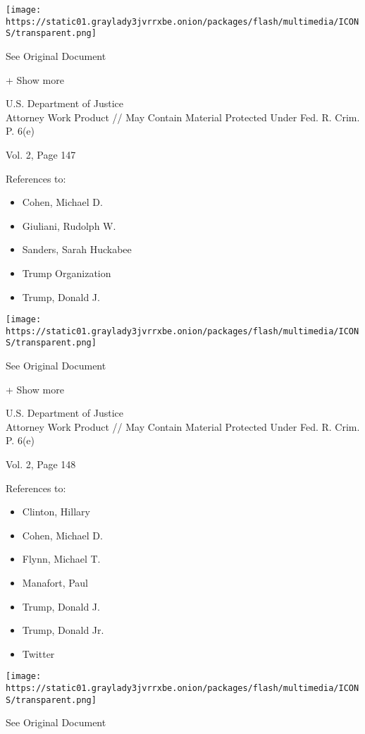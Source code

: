 \protect\hyperlink{}{}

\texttt{[image: https://static01.graylady3jvrrxbe.onion/packages/flash/multimedia/ICONS/transparent.png]}

See Original Document

+ Show more

U.S. Department of Justice\\
Attorney Work Product // May Contain Material Protected Under Fed. R.
Crim. P. 6(e)

Vol. 2, Page 147

References to:

\begin{itemize}
\tightlist
\item
  Cohen, Michael D.
\item
  Giuliani, Rudolph W.
\item
  Sanders, Sarah Huckabee
\item
  Trump Organization
\item
  Trump, Donald J.
\end{itemize}

\protect\hyperlink{}{}

\texttt{[image: https://static01.graylady3jvrrxbe.onion/packages/flash/multimedia/ICONS/transparent.png]}

See Original Document

+ Show more

U.S. Department of Justice\\
Attorney Work Product // May Contain Material Protected Under Fed. R.
Crim. P. 6(e)

Vol. 2, Page 148

References to:

\begin{itemize}
\tightlist
\item
  Clinton, Hillary
\item
  Cohen, Michael D.
\item
  Flynn, Michael T.
\item
  Manafort, Paul 
\item
  Trump, Donald J.
\item
  Trump, Donald Jr.
\item
  Twitter
\end{itemize}

\protect\hyperlink{}{}

\texttt{[image: https://static01.graylady3jvrrxbe.onion/packages/flash/multimedia/ICONS/transparent.png]}

See Original Document

